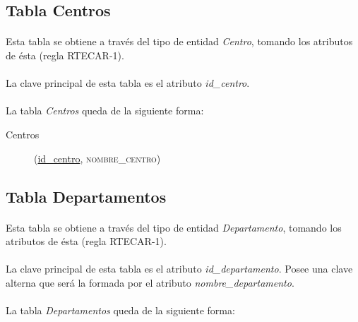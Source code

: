    \subsection{Tabla Centros}

      \paragraph{}Esta tabla se obtiene a través del tipo de entidad
      \textit{Centro}, tomando los atributos de ésta (regla RTECAR-1).

      \paragraph{}La clave principal de esta tabla es el atributo
      \textit{id\_centro}.

      \paragraph{}La tabla \textit{Centros} queda de la siguiente forma:

      \begin{description}
         \item[Centros] \begin{flushleft}(\underline{id\_centro},
         \textsc{nombre\_centro})\end{flushleft}
      \end{description}

   \subsection{Tabla Departamentos}

      \paragraph{}Esta tabla se obtiene a través del tipo de entidad
      \textit{Departamento}, tomando los atributos de ésta (regla RTECAR-1).

      \paragraph{}La clave principal de esta tabla es el atributo
      \textit{id\_departamento}. Posee una clave alterna que será la formada por
      el atributo \textit{nombre\_departamento}.

      \paragraph{}La tabla \textit{Departamentos} queda de la siguiente forma:

